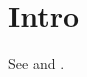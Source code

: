 \documentclass{article}
\begin{document}
\section{Intro}
See \cite{alpha} and \cite{beta}.
\end{document}
